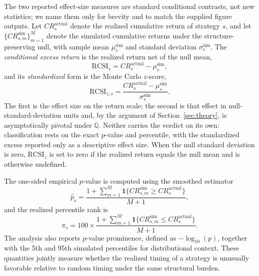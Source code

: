 \documentclass[preprint,12pt]{elsarticle}
\theoremstyle{definition}
\begin{document}
The two reported effect-size measures are standard conditional contrasts, not new statistics; we name them only for brevity and to match the supplied figure outputs. Let \(CR_s^{\mathrm{actual}}\) denote the realized cumulative return of strategy \(s\), and let \(\{CR_{s,m}^{\mathrm{sim}}\}_{m=1}^{M}\) denote the simulated cumulative returns under the structure-preserving null, with sample mean \(\mu_s^{\mathrm{sim}}\) and standard deviation \(\sigma_s^{\mathrm{sim}}\). The \emph{conditional excess return} is the realized return net of the null mean,
\begin{equation}
\mathrm{RCSI}_s = CR_s^{\mathrm{actual}} - \mu_s^{\mathrm{sim}},
\end{equation}
and its \emph{standardized} form is the Monte Carlo $z$-score,
\begin{equation}
\mathrm{RCSI}_{z,s}=\frac{CR_s^{\mathrm{actual}}-\mu_s^{\mathrm{sim}}}{\sigma_s^{\mathrm{sim}}}.
\end{equation}
The first is the effect size on the return scale; the second is that effect in null-standard-deviation units and, by the argument of Section~\ref{sec:theory}, is asymptotically pivotal under $\mathbb{Q}$. Neither carries the verdict on its own: classification rests on the exact $p$-value and percentile, with the standardized excess reported only as a descriptive effect size. When the null standard deviation is zero, $\mathrm{RCSI}_z$ is set to zero if the realized return equals the null mean and is otherwise undefined.

The one-sided empirical \(p\)-value is computed using the smoothed estimator
\begin{equation}
\hat{p}_s
=
\frac{1+\sum_{m=1}^{M}\mathbf{1}\{CR_{s,m}^{\mathrm{sim}}\ge CR_s^{\mathrm{actual}}\}}{M+1},
\end{equation}
and the realized percentile rank is
\begin{equation}
\pi_s
=
100\times
\frac{1+\sum_{m=1}^{M}\mathbf{1}\{CR_{s,m}^{\mathrm{sim}}\le CR_s^{\mathrm{actual}}\}}{M+1}.
\end{equation}
The analysis also reports \(p\)-value prominence, defined as \(-\log_{10}(p)\), together with the 5th and 95th simulated percentiles for distributional context. These quantities jointly measure whether the realized timing of a strategy is unusually favorable relative to random timing under the same structural burden.
\end{document}

